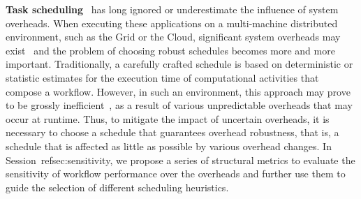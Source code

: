 \textbf{Task scheduling}~\cite{Caniou2011, Blythe2005, Casanova2000} has long ignored or underestimate the influence of system overheads. When executing these applications on a multi-machine distributed environment, such as the Grid or the Cloud, significant system overheads may exist~\cite{Chen2011, Prodan2008, Dong2010, Yang03, Chen2012b} and the problem of choosing robust schedules becomes more and more important. Traditionally, a carefully crafted schedule is based on deterministic or statistic estimates for the execution time of computational activities that compose a workflow. However, in such an environment, this approach may prove to be grossly inefficient~\cite{Chen2012b}, as a result of various unpredictable overheads that may occur at runtime. Thus, to mitigate the impact of uncertain overheads, it is necessary to choose a schedule that guarantees overhead robustness, that is, a schedule that is affected as little as possible by various overhead changes. In Session~ref{sec:sensitivity}, we propose a series of structural metrics to evaluate the sensitivity of workflow performance over the overheads and further use them to guide the selection of different scheduling heuristics. 







